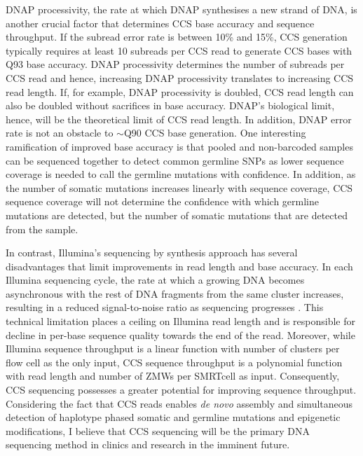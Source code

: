 
DNAP processivity, the rate at which DNAP synthesises a new strand of DNA, is another crucial factor that determines CCS base accuracy and sequence throughput. If the subread error rate is between 10\% and 15\%, CCS generation typically requires at least 10 subreads per CCS read to generate CCS bases with Q93 base accuracy. DNAP processivity determines the number of subreads per CCS read and hence, increasing DNAP processivity translates to increasing CCS read length. If, for example, DNAP processivity is doubled, CCS read length can also be doubled without sacrifices in base accuracy. DNAP’s biological limit, hence, will be the theoretical limit of CCS read length. In addition, DNAP error rate is not an obstacle to $\sim$Q90 CCS base generation. One interesting ramification of improved base accuracy is that pooled and non-barcoded samples can be sequenced together to detect common germline SNPs as lower sequence coverage is needed to call the germline mutations with confidence. In addition, as the number of somatic mutations increases linearly with sequence coverage, CCS sequence coverage will not determine the confidence with which germline mutations are detected, but the number of somatic mutations that are detected from the sample. 

In contrast, Illumina’s sequencing by synthesis approach has several disadvantages that limit improvements in read length and base accuracy. In each Illumina sequencing cycle, the rate at which a growing DNA becomes asynchronous with the rest of DNA fragments from the same cluster increases, resulting in a reduced signal-to-noise ratio as sequencing progresses \cite{Metzker2005-am}. This technical limitation places a ceiling on Illumina read length and is responsible for decline in per-base sequence quality towards the end of the read. Moreover, while Illumina sequence throughput is a linear function with number of clusters per flow cell as the only input, CCS sequence throughput is a polynomial function with read length and number of ZMWs per SMRTcell as input. Consequently, CCS sequencing possesses a greater potential for improving sequence throughput. Considering the fact that CCS reads enables \textit{de novo} assembly and simultaneous detection of haplotype phased somatic and germline mutations and epigenetic modifications, I believe that CCS sequencing will be the primary DNA sequencing method in clinics and research in the imminent future. 

